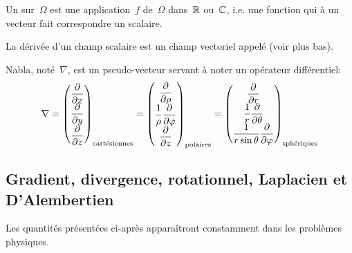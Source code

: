\begin{definition}
Un  sur~$\Omega$ est une application~$f$ de~$\Omega$ dans~$\mathbb R$ ou~$\mathbb C$, i.e. une fonction qui à un vecteur fait correspondre un scalaire.
\end{definition}
La dérivée d'un champ scalaire est un champ vectoriel appelé  (voir plus bas).

\medskip
{} Nabla, noté~$\nabla$, est un pseudo-vecteur  servant à noter un opérateur différentiel:
\begin{equation}
\nabla = \VV*{{\dfrac\partial{\partial x}}\\ \dfrac\partial{\partial y}\\ \dfrac\partial{\partial z}}_{\text{cartésiennes}}
= \VV*{\dfrac\partial{\partial \rho}\\ \dfrac1\rho \dfrac\partial{\partial \varphi}\\ \dfrac\partial{\partial z}}_{\text{polaires}}
= \VV*{\dfrac\partial{\partial r}\\ \dfrac1r \dfrac\partial{\partial \theta}\\\dfrac1{r\sin\theta} \dfrac\partial{\partial \varphi}}_{\text{sphériques}}
\end{equation}

\medskip
\subsection{Gradient, divergence, rotationnel, Laplacien et D'Alembertien}

Les quantités présentées ci-après apparaîtront constamment dans les problèmes physiques.%

